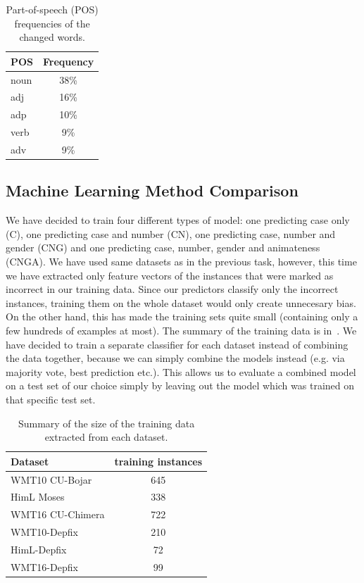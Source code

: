 \begin{table}[t]
\centering
\small

\begin{tabular}{lc}
POS  &  Frequency  \\
\hline
noun    &   38\%  \\
adj     &   16\%  \\
adp     &   10\%  \\
verb    &   9\%  \\
adv     &   9\%  \\
\end{tabular}
\caption{
    Part-of-speech (POS) frequencies of the changed words.
}
\label{changes-pos}
\end{table}


\subsection{Machine Learning Method Comparison}

We have decided to train four different types of model: one predicting case only (C), one predicting case and number (CN),
 one predicting case, number and gender (CNG) and one predicting case, number, gender and animateness (CNGA).
We have used same datasets as in the previous task, however, this
time we have extracted only feature vectors of the instances that were marked as incorrect in our training data. Since
our predictors classify only the incorrect instances, training them on the whole dataset would only create
unnecesary bias. On the other hand, this has made the training sets quite small (containing only a few hundreds of examples
at most). The summary of the training data is in~. We have decided to train a separate classifier
for each dataset instead of combining the data together, because we can simply combine the models instead (e.g. via majority
vote, best prediction etc.). This allows us to evaluate a combined model on a test set of our choice simply by leaving
out the model which was trained on that specific test set.

\begin{table}[t]
\centering
\small

\begin{tabular}{lc}
Dataset  &  \hash{} training instances  \\
\hline
WMT10 CU-Bojar  &  645  \\
HimL Moses  & 338  \\
WMT16 CU-Chimera  &  722  \\
WMT10-Depfix  &  210  \\
HimL-Depfix  &  72  \\
WMT16-Depfix  &  99  \\
\end{tabular}
\caption{
    Summary of the size of the training data extracted from each dataset.
}
\label{cats-training-sum}
\end{table}

